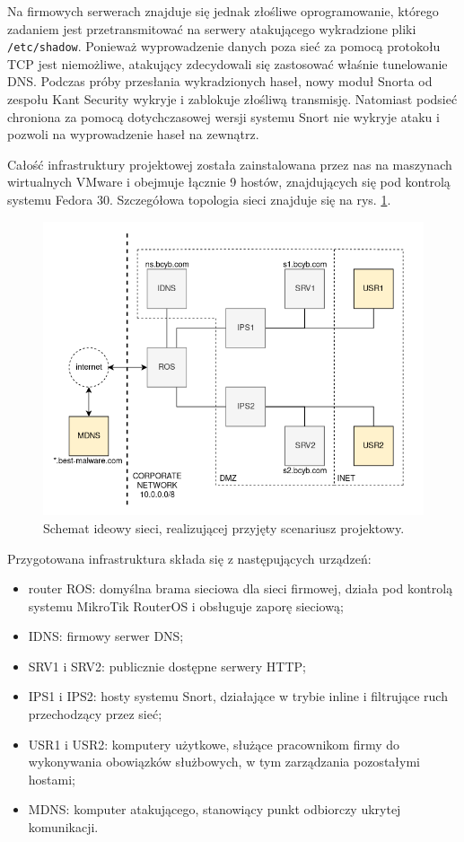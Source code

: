 \documentclass{eiti-raport}
\begin{document}
Na firmowych serwerach znajduje się jednak złośliwe oprogramowanie, którego zadaniem jest przetransmitować na serwery atakującego wykradzione pliki \texttt{/etc/shadow}. Ponieważ wyprowadzenie danych poza sieć za pomocą protokołu TCP jest niemożliwe, atakujący zdecydowali się zastosować właśnie tunelowanie DNS. Podczas próby przesłania wykradzionych haseł, nowy moduł Snorta od zespołu Kant Security wykryje i zablokuje złośliwą transmisję. Natomiast podsieć chroniona za pomocą dotychczasowej wersji systemu Snort nie wykryje ataku i pozwoli na wyprowadzenie haseł na zewnątrz. 

Całość infrastruktury projektowej została zainstalowana przez nas na maszynach wirtualnych VMware i obejmuje łącznie 9 hostów, znajdujących się pod kontrolą systemu Fedora 30. Szczegółowa topologia sieci znajduje się na rys. \ref{fig:topologia}. 
\begin{figure}[!h] \centering
	\includegraphics[width=0.9\linewidth]{img/BCYB_topologia.png}
	\caption{Schemat ideowy sieci, realizującej przyjęty scenariusz projektowy.} \label{fig:topologia}
\end{figure}
Przygotowana infrastruktura składa się z następujących urządzeń: 
\begin{itemize}
	\item router ROS: domyślna brama sieciowa dla sieci firmowej, działa pod kontrolą systemu MikroTik RouterOS i obsługuje zaporę sieciową;
	\item IDNS: firmowy serwer DNS;
	\item SRV1 i SRV2: publicznie dostępne serwery HTTP;
	\item IPS1 i IPS2: hosty systemu Snort, działające w trybie inline i filtrujące ruch przechodzący przez sieć;
	\item USR1 i USR2: komputery użytkowe, służące pracownikom firmy do wykonywania obowiązków służbowych, w tym zarządzania pozostałymi hostami;
	\item MDNS: komputer atakującego, stanowiący punkt odbiorczy ukrytej komunikacji. 
\end{itemize}
\end{document}
